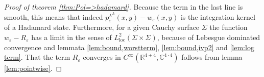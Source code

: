 \documentclass[b5paper,draft,openbib,12pt]{memoir}
\begin{document}
\begin{proof}[Proof of theorem \ref{thm:Pol=>hadamard}]
Because the term in the last line is smooth, this means that indeed \(p_\varepsilon^{\lambda^A}(x,y)-w_\varepsilon(x,y)\) is the integration kernel of a Hadamard state.
Furthermore, for a given Cauchy surface \(\Sigma\) the function \(w_\varepsilon-R_\varepsilon\) has a limit in the sense of \(L^2_{\text{loc}}(\Sigma\times\Sigma)\),
because of
Lebesgue dominated convergence and
lemmata \ref{lem:bound,worstterm}, \ref{lem:bound,ivp2} and  \ref{lem:log term}. That the term \(R_\varepsilon\) 
converges in \(C^\infty(\mathbb{R}^{4+4},\mathbb{C}^{4\cdot 4})\) follows from lemma \ref{lem:pointwise}.

\end{proof}
\end{document}
